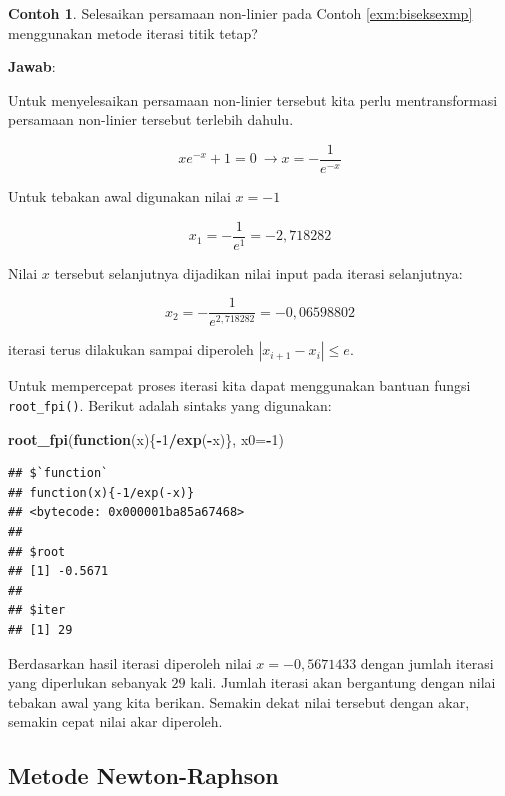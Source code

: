 \documentclass[
]{book}
\newenvironment{Shaded}{\begin{snugshade}}{\end{snugshade}}
\newcommand{\AttributeTok}[1]{\textcolor[rgb]{0.13,0.29,0.53}{#1}}
\newcommand{\ControlFlowTok}[1]{\textcolor[rgb]{0.13,0.29,0.53}{\textbf{#1}}}
\newcommand{\DecValTok}[1]{\textcolor[rgb]{0.00,0.00,0.81}{#1}}
\newcommand{\FunctionTok}[1]{\textcolor[rgb]{0.13,0.29,0.53}{\textbf{#1}}}
\newcommand{\NormalTok}[1]{#1}
\newcommand{\SpecialCharTok}[1]{\textcolor[rgb]{0.81,0.36,0.00}{\textbf{#1}}}
\theoremstyle{definition}
\theoremstyle{definition}
\newtheorem{example}{Contoh}[chapter]
\theoremstyle{definition}
\theoremstyle{definition}
\theoremstyle{remark}
\begin{document}
\begin{example}
\protect\hypertarget{exm:fixexmp}{}\label{exm:fixexmp}Selesaikan persamaan non-linier pada Contoh \ref{exm:biseksexmp} menggunakan metode iterasi titik tetap?
\end{example}

\textbf{Jawab}:

Untuk menyelesaikan persamaan non-linier tersebut kita perlu mentransformasi persamaan non-linier tersebut terlebih dahulu.

\[
xe^{-x}+1=0\ \to x=-\frac{1}{e^{-x}}
\]

Untuk tebakan awal digunakan nilai \(x=-1\)

\[
x_1 = -\frac{1}{e^{1}}=-2,718282
\]

Nilai \(x\) tersebut selanjutnya dijadikan nilai input pada iterasi selanjutnya:

\[
x_2 = -\frac{1}{e^{2,718282}}=-0,06598802
\]

iterasi terus dilakukan sampai diperoleh \(\left| x_{i+1}-x_i \right|\le e\).

Untuk mempercepat proses iterasi kita dapat menggunakan bantuan fungsi \texttt{root\_fpi()}. Berikut adalah sintaks yang digunakan:

\begin{Shaded}
\begin{Highlighting}[]
\FunctionTok{root\_fpi}\NormalTok{(}\ControlFlowTok{function}\NormalTok{(x)\{}\SpecialCharTok{{-}}\DecValTok{1}\SpecialCharTok{/}\FunctionTok{exp}\NormalTok{(}\SpecialCharTok{{-}}\NormalTok{x)\}, }\AttributeTok{x0=}\SpecialCharTok{{-}}\DecValTok{1}\NormalTok{)}
\end{Highlighting}
\end{Shaded}

\begin{verbatim}
## $`function`
## function(x){-1/exp(-x)}
## <bytecode: 0x000001ba85a67468>
## 
## $root
## [1] -0.5671
## 
## $iter
## [1] 29
\end{verbatim}

Berdasarkan hasil iterasi diperoleh nilai \(x=-0,5671433\) dengan jumlah iterasi yang diperlukan sebanyak \(29\) kali. Jumlah iterasi akan bergantung dengan nilai tebakan awal yang kita berikan. Semakin dekat nilai tersebut dengan akar, semakin cepat nilai akar diperoleh.

\hypertarget{newtonraphson}{%
\subsection{Metode Newton-Raphson}\label{newtonraphson}}
\end{document}
